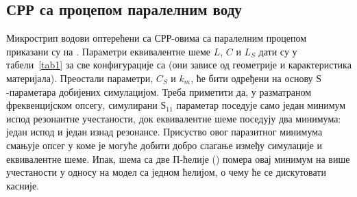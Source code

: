 \subsection{СРР са процепом паралелним воду}\label{sec3:2}
Микрострип водови оптерећени са СРР-овима са паралелним процепом приказани су на .
Параметри еквивалентне шеме $L$, $C$ и $L_S$ дати су у табели~\ref{tab1} за све конфигурације са  (они зависе од геометрије и карактеристика материјала). Преостали параметри, $C_S$ и $k_m$, ће бити одређени на основу $Ѕ$-параметара добијених симулацијом. Треба приметити да, у разматраном фреквенцијском опсегу, симулирани $Ѕ_{11}$ параметар поседује само један минимум испод резонантне учестаности, док еквивалентне шеме поседују два минимума: један испод и један изнад резонансе. Присуство овог паразитног минимума смањује опсег у коме је могуће добити добро слагање између симулације и еквивалентне шеме. Ипак, шема са две П-ћелије () помера овај минимум на више учестаности у односу на модел са једном ћелијом, о чему ће се дискутовати касније.
